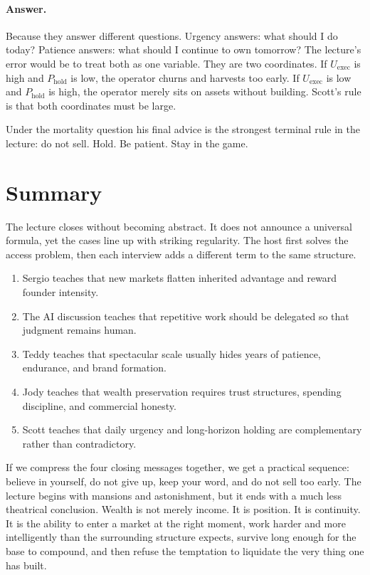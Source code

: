 \paragraph{Answer.}
Because they answer different questions. Urgency answers: what should I do today? Patience answers: what should I continue to own tomorrow? The lecture's error would be to treat both as one variable. They are two coordinates. If \(U_{\mathrm{exec}}\) is high and \(P_{\mathrm{hold}}\) is low, the operator churns and harvests too early. If \(U_{\mathrm{exec}}\) is low and \(P_{\mathrm{hold}}\) is high, the operator merely sits on assets without building. Scott's rule is that both coordinates must be large.

Under the mortality question his final advice is the strongest terminal rule in the lecture: do not sell. Hold. Be patient. Stay in the game.

\section{Summary}

The lecture closes without becoming abstract. It does not announce a universal formula, yet the cases line up with striking regularity. The host first solves the access problem, then each interview adds a different term to the same structure.

\begin{enumerate}
\item Sergio teaches that new markets flatten inherited advantage and reward founder intensity.
\item The AI discussion teaches that repetitive work should be delegated so that judgment remains human.
\item Teddy teaches that spectacular scale usually hides years of patience, endurance, and brand formation.
\item Jody teaches that wealth preservation requires trust structures, spending discipline, and commercial honesty.
\item Scott teaches that daily urgency and long-horizon holding are complementary rather than contradictory.
\end{enumerate}

If we compress the four closing messages together, we get a practical sequence: believe in yourself, do not give up, keep your word, and do not sell too early. The lecture begins with mansions and astonishment, but it ends with a much less theatrical conclusion. Wealth is not merely income. It is position. It is continuity. It is the ability to enter a market at the right moment, work harder and more intelligently than the surrounding structure expects, survive long enough for the base to compound, and then refuse the temptation to liquidate the very thing one has built.